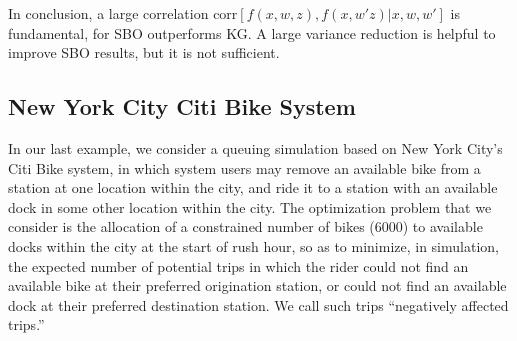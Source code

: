 \documentclass{article}
\begin{document}

In conclusion, a large correlation $\mbox{corr}\left[f\left(x,w,z\right),f\left(x,w'z\right)|x,w,w'\right]$ is fundamental, for SBO outperforms KG. A large variance reduction is helpful to improve SBO results, but it is not sufficient.

\subsection{New York City Citi Bike System}
\label{sec:citibike}

In our last example, we consider a queuing simulation based on New York City's Citi Bike system, in which system users may remove an available bike from a station at one location within the city, and ride it to a station with an available dock in some other location within the city.  The optimization problem that we consider is the allocation of a constrained number of bikes (6000) to available docks within the city at the start of rush hour, so as to minimize, in simulation, the expected number of potential trips in which the rider could not find an available bike at their preferred origination station, or could not find an available dock at their preferred destination station.  We call such trips ``negatively affected trips.''
\end{document}
